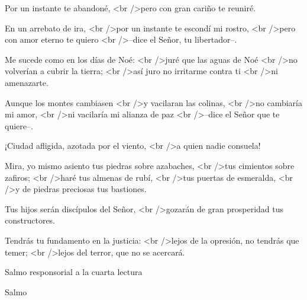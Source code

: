 			\begin{readtalk}Por un instante te abandoné, <br />pero con gran cariño te reuniré. \end{readtalk}
			
			\begin{readtalk}En un arrebato de ira, <br />por un instante te escondí mi rostro, <br />pero con amor eterno te quiero <br />–dice el Señor, tu libertador–. \end{readtalk}
			
			\begin{readtalk}Me sucede como en los días de Noé: <br />juré que las aguas de Noé <br />no volverían a cubrir la tierra; <br />así juro no irritarme contra ti <br />ni amenazarte. \end{readtalk}
			
			\begin{readtalk}Aunque los montes cambiasen <br />y vacilaran las colinas, <br />no cambiaría mi amor, <br />ni vacilaría mi alianza de paz <br />–dice el Señor que te quiere–. \end{readtalk}
			
			\begin{readtalk}¡Ciudad afligida, azotada por el viento, <br />a quien nadie consuela! \end{readtalk}
			
			\begin{readtalk}Mira, yo mismo asiento tus piedras sobre azabaches, <br />tus cimientos sobre zafiros; <br />haré tus almenas de rubí, <br />tus puertas de esmeralda, <br />y de piedras preciosas tus bastiones. \end{readtalk}
			
			\begin{readtalk}Tus hijos serán discípulos del Señor, <br />gozarán de gran prosperidad tus constructores. \end{readtalk}
			
			\begin{readtalk}Tendrás tu fundamento en la justicia: <br />lejos de la opresión, no tendrás que temer; <br />lejos del terror, que no se acercará.\end{readtalk}
			
			\begin{readtitle}Salmo responsorial a la cuarta lectura\end{readtitle}
			
			\begin{readbook}Salmo \end{readbook}
			
